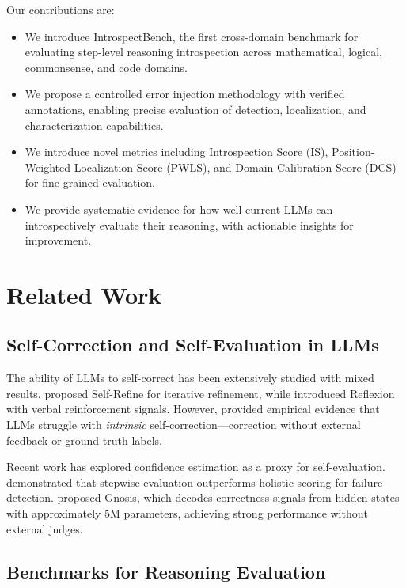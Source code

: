 \documentclass{article}
\begin{document}
Our contributions are:
\begin{itemize}
    \item We introduce IntrospectBench, the first cross-domain benchmark for evaluating step-level reasoning introspection across mathematical, logical, commonsense, and code domains.
    \item We propose a controlled error injection methodology with verified annotations, enabling precise evaluation of detection, localization, and characterization capabilities.
    \item We introduce novel metrics including Introspection Score (IS), Position-Weighted Localization Score (PWLS), and Domain Calibration Score (DCS) for fine-grained evaluation.
    \item We provide systematic evidence for how well current LLMs can introspectively evaluate their reasoning, with actionable insights for improvement.
\end{itemize}

\section{Related Work}

\subsection{Self-Correction and Self-Evaluation in LLMs}

The ability of LLMs to self-correct has been extensively studied with mixed results. \citet{madaan2023selfrefine} proposed Self-Refine for iterative refinement, while \citet{shinn2023reflexion} introduced Reflexion with verbal reinforcement signals. However, \citet{huang2024llmscannotselfcorrect} provided empirical evidence that LLMs struggle with \textit{intrinsic} self-correction---correction without external feedback or ground-truth labels.

Recent work has explored confidence estimation as a proxy for self-evaluation. \citet{mavi2025selfevaluating} demonstrated that stepwise evaluation outperforms holistic scoring for failure detection. \citet{ghasemabadi2025gnosis} proposed Gnosis, which decodes correctness signals from hidden states with approximately 5M parameters, achieving strong performance without external judges.

\subsection{Benchmarks for Reasoning Evaluation}
\end{document}
